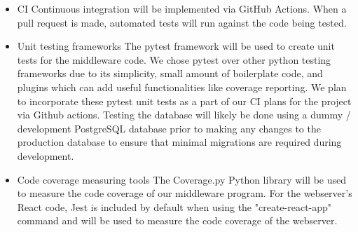 \documentclass{article}
\begin{document}
\begin{itemize}

\item CI
\subitem Continuous integration will be implemented via GitHub Actions. When a pull request is made, automated
tests will run against the code being tested.
\item Unit testing frameworks
\subitem The pytest framework will be used to create unit tests for the middleware
code. We chose pytest over other python testing frameworks due to its simplicity, 
small amount of boilerplate code, and plugins which can add useful functionalities
like coverage reporting. We plan to incorporate these pytest unit tests as a part
of our CI plans for the project via Github actions.
\subitem Testing the database will likely be done using a dummy / development 
PostgreSQL database prior to making any changes to the production database to 
ensure that minimal migrations are required during development.
\item Code coverage measuring tools
\subitem The Coverage.py Python library will be used to measure the code coverage
of our middleware program. For the webserver's React code, Jest is included by 
default when using the "create-react-app" command and will be used to measure 
the code coverage of the webserver.

\end{itemize}
\end{document}
